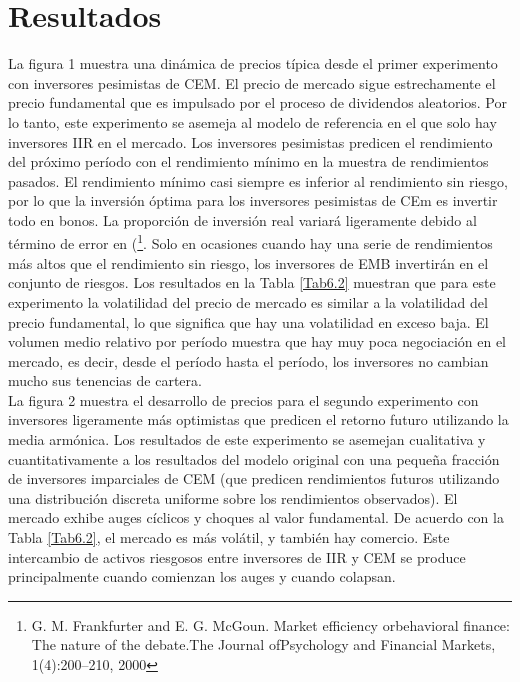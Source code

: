 \documentclass[12pt,a4paper]{article}
\begin{document}
\section*{Resultados}
La figura 1 muestra una dinámica de precios típica desde el primer experimento con inversores pesimistas de CEM. El precio de mercado sigue estrechamente el precio fundamental que es impulsado por el proceso de dividendos aleatorios. Por lo tanto, este experimento se asemeja al modelo de referencia en el que solo hay inversores IIR en el mercado. Los inversores pesimistas predicen el rendimiento del próximo período con el rendimiento mínimo en la muestra de rendimientos pasados. El rendimiento mínimo casi siempre es inferior al rendimiento sin riesgo, por lo que la inversión óptima para los inversores pesimistas de CEm es invertir todo en bonos. La proporción de inversión real variará ligeramente debido al término de error en (\footnote{G. M. Frankfurter and E. G. McGoun.  Market efficiency orbehavioral finance: The nature of the debate.The Journal ofPsychology and Financial Markets, 1(4):200–210, 2000}. Solo en ocasiones cuando hay una serie de rendimientos más altos que el rendimiento sin riesgo, los inversores de EMB invertirán en el conjunto de riesgos. Los resultados en la Tabla \ref{Tab6.2} muestran que para este experimento la volatilidad del precio de mercado es similar a la volatilidad del precio fundamental, lo que significa que hay una volatilidad en exceso baja. El volumen medio relativo por período muestra que hay muy poca negociación en el mercado, es decir, desde el período hasta el período, los inversores no cambian mucho sus tenencias de cartera.\\
\quad La figura 2 muestra el desarrollo de precios para el segundo experimento con inversores ligeramente más optimistas que predicen el retorno futuro utilizando la media armónica. Los resultados de este experimento se asemejan cualitativa y cuantitativamente a los resultados del modelo original con una pequeña fracción de inversores imparciales de CEM (que predicen rendimientos futuros utilizando una distribución discreta uniforme sobre los rendimientos observados). El mercado exhibe auges cíclicos y choques al valor fundamental. De acuerdo con la Tabla \ref{Tab6.2}, el mercado es más volátil, y también hay comercio. Este intercambio de activos riesgosos entre inversores de IIR y CEM	 se produce principalmente cuando comienzan los auges y cuando colapsan.\\
\end{document}
